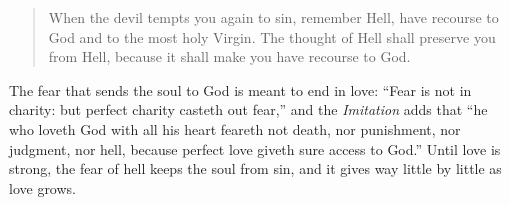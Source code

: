 \begin{quote}
When the devil tempts you again to sin, remember Hell, have recourse to God and to the most holy Virgin. The thought of Hell shall preserve you from Hell, because it shall make you have recourse to God.
\end{quote}

\noindent The fear that sends the soul to God is meant to end in love: ``Fear is not in charity: but perfect charity casteth out fear,'' and the \emph{Imitation} adds that ``he who loveth God with all his heart feareth not death, nor punishment, nor judgment, nor hell, because perfect love giveth sure access to God.'' Until love is strong, the fear of hell keeps the soul from sin, and it gives way little by little as love grows.
